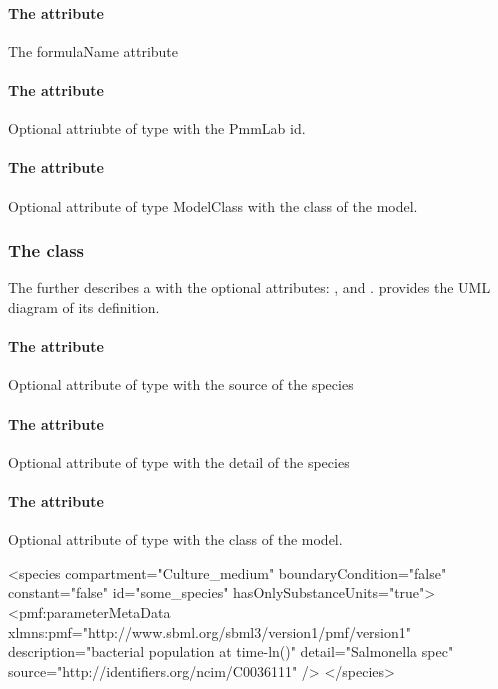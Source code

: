 \paragraph{The  attribute}
The formulaName attribute

\paragraph{The  attribute}
Optional attriubte of type  with the PmmLab id.

\paragraph{The  attribute}
Optional attribute of type ModelClass with the class of the model.


\subsubsection{The  class}
\label{speciesmetadata-class}
The \SpeciesMetaData further describes a \Species with the optional attributes:
,  and . 
provides the UML diagram of its definition.

\paragraph{The  attribute}
Optional attribute of type  with the source of the species

\paragraph{The  attribute}
Optional attribute of type  with the detail of the species

\paragraph{The  attribute}
Optional attribute of type  with the class of the model.

\begin{example}
<species compartment="Culture_medium" boundaryCondition="false" constant="false"
  id="some_species" hasOnlySubstanceUnits="true">
  <pmf:parameterMetaData xlmns:pmf="http://www.sbml.org/sbml3/version1/pmf/version1"
    description="bacterial population at time-ln()" detail="Salmonella spec"
    source="http://identifiers.org/ncim/C0036111" />
</species>
\end{example}


